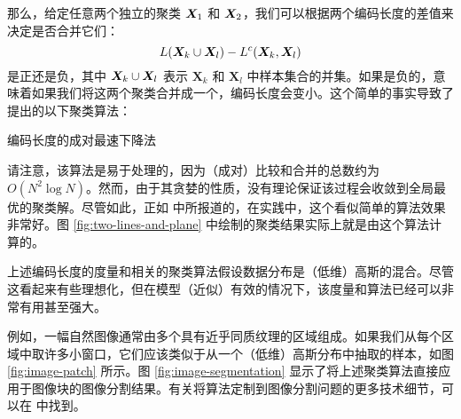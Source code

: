 \documentclass[../../book-main_zh.tex]{subfiles}
\begin{document}
那么，给定任意两个独立的聚类 $\bm{X}_1$ 和 $\bm{X}_2$，我们可以根据两个编码长度的差值来决定是否合并它们：
\begin{equation}
	L(\bm{X}_k \cup \bm{X}_l) - L^c(\bm{X}_k, \bm{X}_l)
\end{equation}
是正还是负，其中 $\bm{X}_k \cup \bm{X}_l$ 表示 $\bm X_k$ 和 $\bm X_l$ 中样本集合的并集。如果是负的，意味着如果我们将这两个聚类合并成一个，编码长度会变小。这个简单的事实导致了 \cite{ma2007segmentation} 提出的以下聚类算法：
\begin{algorithm}[!htbp]
	\caption{编码长度的成对最速下降法}\label{alg:steepest_descent_coding_length}
	\begin{algorithmic}

		 
		 
		\State{\Return{\(\cC\)}} 
		\Else
		 
		 
		\EndIf
		\EndWhile
		\State{\Return{\(\cC\)}}  
		\EndProcedure
	\end{algorithmic}
\end{algorithm}

请注意，该算法是易于处理的，因为（成对）比较和合并的总数约为 $O(N^2\log N)$。然而，由于其贪婪的性质，没有理论保证该过程会收敛到全局最优的聚类解。尽管如此，正如 \cite{ma2007segmentation} 中所报道的，在实践中，这个看似简单的算法效果非常好。图 \ref{fig:two-lines-and-plane} 中绘制的聚类结果实际上就是由这个算法计算的。


\begin{example}[图像分割]\label{eg:image-segmentation} 上述编码长度的度量和相关的聚类算法假设数据分布是（低维）高斯的混合。尽管这看起来有些理想化，但在模型（近似）有效的情况下，该度量和算法已经可以非常有用甚至强大。

	例如，一幅自然图像通常由多个具有近乎同质纹理的区域组成。如果我们从每个区域中取许多小窗口，它们应该类似于从一个（低维）高斯分布中抽取的样本，如图 \ref{fig:image-patch} 所示。图 \ref{fig:image-segmentation} 显示了将上述聚类算法直接应用于图像块的图像分割结果。有关将算法定制到图像分割问题的更多技术细节，可以在 \cite{Mobahi-IJCV2011} 中找到。
\end{example}
\end{document}
